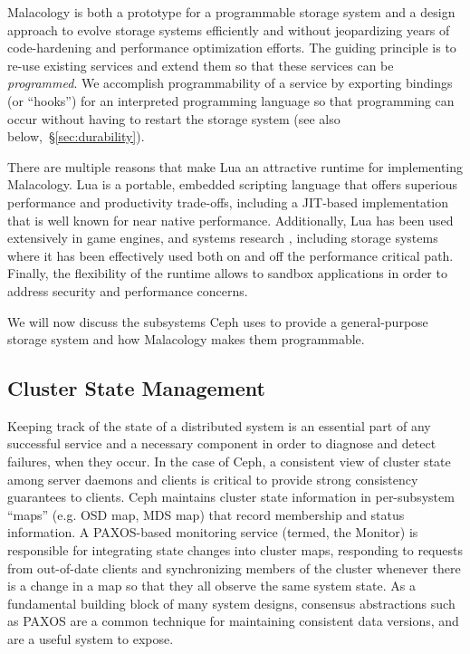 \documentclass[10pt,twocolumn]{article}
\begin{document}
Malacology is both a prototype for a programmable storage system and a design approach to evolve storage systems efficiently and without
jeopardizing years of code-hardening and performance optimization
efforts. The guiding principle is to re-use existing services and extend them so that these services can be \emph{programmed}. We accomplish programmability of a service by exporting bindings (or ``hooks'') for an interpreted programming language so that programming can occur without having to restart the storage system (see also below,~\S\ref{sec:durability}). 

There are multiple reasons that make Lua an attractive runtime for implementing 
Malacology. Lua is a portable, embedded
scripting language that offers superious performance and productivity
trade-offs, including a JIT-based implementation that is well known for near
native performance. Additionally, Lua has been used extensively in game engines, 
and systems research \cite{neto:dls14-luaos}, including storage systems where it 
has been effectively used both on
\cite{grawinkel:pdsw2012-lua,watkins2013:bdmc13-in-vivo,geambasu_comet_2010} and 
off
\cite{sevilla:sc15-mantle} the performance critical path. Finally, the 
flexibility of the runtime allows to sandbox applications in order to address 
security and performance concerns.

We will now discuss the subsystems Ceph uses to provide a general-purpose
storage system and how Malacology makes them programmable.

\subsection{Cluster State Management}
\label{consistencyversioning-of-cluster-state}

Keeping track of the state of a distributed system is an essential part of any 
successful service and a necessary component in order to diagnose and detect 
failures, when they occur. In the case of Ceph, a consistent view of cluster 
state among server daemons and clients is critical to provide strong consistency 
guarantees to clients. Ceph maintains cluster state information in per-subsystem 
``maps'' (e.g. OSD map, MDS map) that record membership and status information. 
A PAXOS-based monitoring service (termed, the Monitor) is responsible for 
integrating state changes into cluster maps, responding to requests from 
out-of-date clients and synchronizing members of the cluster whenever there is a 
change in a map so that they all observe the same system state. As a fundamental 
building block of many system designs, consensus abstractions such as PAXOS are 
a common technique for maintaining consistent data versions, and are a useful 
system to expose.
\end{document}
